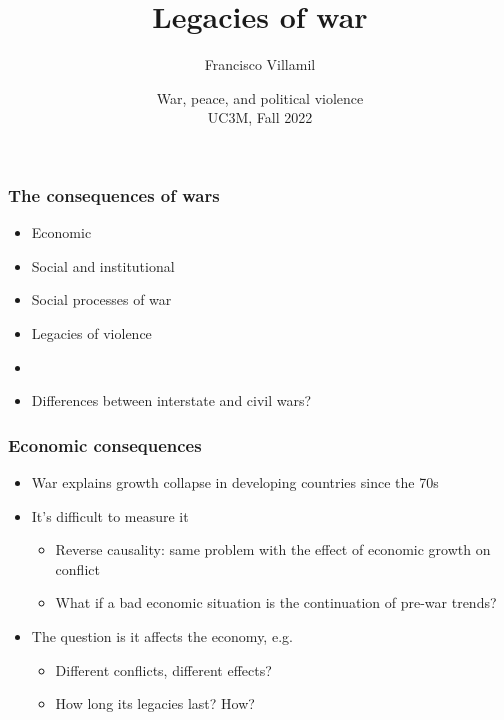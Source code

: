 \documentclass[aspectratio=43]{beamer}
\title{\huge Legacies of war}
\author{Francisco Villamil}
\date{War, peace, and political violence\\UC3M, Fall 2022}
\begin{document}
\begin{frame}
  \titlepage
\end{frame}


\begin{frame}
\frametitle{The consequences of wars}
\centering

\begin{itemize}[<+->]
  \item Economic
  \item Social and institutional
  \item Social processes of war
  \item Legacies of violence
  \item[]
  \item Differences between interstate and civil wars?
\end{itemize}

\end{frame}

\begin{frame}
\frametitle{Economic consequences}
\centering

\begin{itemize}[<+->]
  \item War explains growth collapse in developing countries since the 70s
  \item It's difficult to measure it
  \begin{itemize}
    \item Reverse causality: same problem with the effect of economic growth on conflict
    \item What if a bad economic situation is the continuation of pre-war trends?
  \end{itemize}
  \item The question is {} it affects the economy, e.g.
  \begin{itemize}
    \item Different conflicts, different effects?
    \item How long its legacies last? How?
  \end{itemize}
\end{itemize}

\end{frame}
\end{document}
